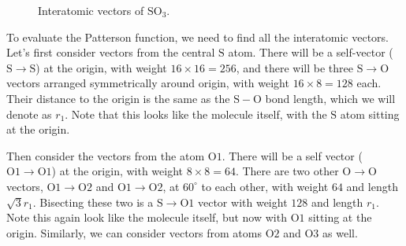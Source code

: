 \documentclass{article}
\theoremstyle{plain}\theoremheaderfont{\normalfont\itshape}\theorembodyfont{\rmfamily}\theoremseparator{.}\newtheorem*{rem}{Remark}\newtheorem*{ex}{Example}\newtheorem*{proof}{Proof}\newtheorem*{altp}{Alternative proof}
\theoremstyle{plain}\theoremheaderfont{\normalfont\bfseries}\theorembodyfont{\rmfamily}\theoremseparator{.}\newtheorem{thm}{Theorem}[section]\newtheorem{lem}[thm]{Lemma}\newtheorem{prop}[thm]{Proposition}\newtheorem*{cor}{Corollary}\newtheorem{defn}[thm]{Definition}\newtheorem{clm}[thm]{Claim}\newtheorem{clminproof}{Claim}\newtheorem*{law}{Law}\newtheorem{pos}[thm]{Postulate}
\theoremstyle{break}\theoremheaderfont{\normalfont\itshape}\theorembodyfont{\rmfamily}\theoremseparator{.\medskip}\newtheorem*{proofskip}{Proof}\newtheorem*{exs}{Examples}\newtheorem*{rems}{Remarks}
\theoremstyle{break}\theoremheaderfont{\normalfont\bfseries}\theorembodyfont{\rmfamily}\theoremseparator{.\medskip}\newtheorem{lemskip}[thm]{Lemma}\newtheorem{defnskip}[thm]{Definition}\newtheorem{propskip}[thm]{Proposition}\newtheorem{thmskip}[thm]{Theorem}
\numberwithin{equation}{section}
\begin{document}
\begin{figure}[ht!]
        \caption{Interatomic vectors of \(\mathrm{SO_3}\).}
    \end{figure}

    To evaluate the Patterson function, we need to find all the interatomic vectors. Let's first consider vectors from the central \(\mathrm{S}\) atom. There will be a self-vector (\(\mathrm{S\to S}\)) at the origin, with weight \(16\times 16=256\), and there will be three \(\mathrm{S\to O}\) vectors arranged symmetrically around origin, with weight \(16\times 8=128\) each. Their distance to the origin is the same as the \(\mathrm{S-O}\) bond length, which we will denote as \(r_1\). Note that this looks like the molecule itself, with the \(\mathrm{S}\) atom sitting at the origin.

    Then consider the vectors from the atom \(\mathrm{O1}\). There will be a self vector (\(\mathrm{O1\to O1}\)) at the origin, with weight \(8\times 8=64\). There are two other \(\mathrm{O\to O}\) vectors, \(\mathrm{O1\to O2}\) and \(\mathrm{O1\to O2}\), at \(60^\circ\) to each other, with weight \(64\) and length \(\sqrt{3}r_1\). Bisecting these two is a \(\mathrm{S\to O1}\) vector with weight \(128\) and length \(r_1\). Note this again look like the molecule itself, but now with \(\mathrm{O1}\) sitting at the origin. Similarly, we can consider vectors from atoms \(\mathrm{O2}\) and \(\mathrm{O3}\) as well.
\end{document}

